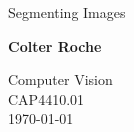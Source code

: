 \begin{titlepage}
    \begin{center}
        \vspace*{1cm}
            
        \Huge
        \textbf{}
            
        \vspace{0.5cm}
        \LARGE
        Segmenting Images
            
        \vspace{1.5cm}
            
        \textbf{Colter Roche}
            
        \vfill
          
        \Large
        Computer Vision\\
        CAP4410.01\\
        \today
            
    \end{center}
\end{titlepage}